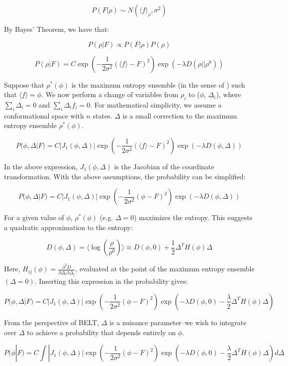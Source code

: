 \documentclass[12pt]{article}
\begin{document}
$$P(F|\rho) \sim N(\langle f\rangle_\rho, \sigma^2)$$

By Bayes' Theorem, we have that:

$$P(\rho | F) \propto P(F | \rho) P(\rho)$$

$$P(\rho | F) = C \exp(-\frac{1}{2\sigma^2} (\langle f \rangle - F)^2) \exp(-\lambda D(\rho || \rho^0))$$

Suppose that $\rho^*(\phi)$ is the maximum entropy ensemble (in the sense of \cite{chodera2012}) such that $\langle f \rangle = \phi$.  We now perform a change of variables from $\rho_i$ to ($\phi$, $\Delta_i$), where $\sum_i \Delta_i = 0$ and $\sum_i \Delta_i f_i = 0$.  For mathematical simplicity, we assume a conformational space with $n$ states.  $\Delta$ is a small correction to the maximum entropy ensemble $\rho^*(\phi)$.  

$$P(\phi, \Delta | F) = C |J_1(\phi, \Delta)| \exp(-\frac{1}{2\sigma^2} (\langle f \rangle - F)^2) \exp(-\lambda D(\phi, \Delta)) $$

In the above expression, $J_1(\phi, \Delta)$ is the Jacobian of the coordinate transformation.  With the above assumptions, the probability can be simplified:

$$P(\phi, \Delta | F) = C |J_1(\phi, \Delta)| \exp(-\frac{1}{2\sigma^2} (\phi - F)^2) \exp(-\lambda D(\phi, \Delta)) $$

For a given value of $\phi$, $\rho^*(\phi)$ (e.g. $\Delta = 0$) maximizes the entropy.  This suggests a quadratic approximation to the entropy:

$$D(\phi, \Delta) = \langle \log(\frac{\rho}{\rho^0})\rangle \approx D(\phi, 0) + \frac{1}{2} \Delta^T H(\phi) \Delta$$

Here, $H_{ij}(\phi) = \frac{\partial^2 D}{\partial \Delta_i \partial \Delta_j}$, evaluated at the point of the maximum entropy ensemble $(\Delta = 0)$.  Inserting this expression in the probability gives:

$$P(\phi, \Delta | F) = C |J_1(\phi, \Delta)| \exp(-\frac{1}{2\sigma^2} (\phi - F)^2) \exp(-\lambda  D(\phi, 0) - \frac{\lambda}{2} \Delta^T H(\phi) \Delta)$$

From the perspective of BELT, $\Delta$ is a nuisance parameter--we wish to integrate over $\Delta$ to achieve a probability that depends entirely on $\phi$.  

$$P(\phi | F) = C \int |J_1(\phi, \Delta)| \exp(-\frac{1}{2\sigma^2} (\phi - F)^2) \exp(-\lambda  D(\phi, 0) - \frac{\lambda}{2} \Delta^T H(\phi) \Delta) d\Delta $$
\end{document}
